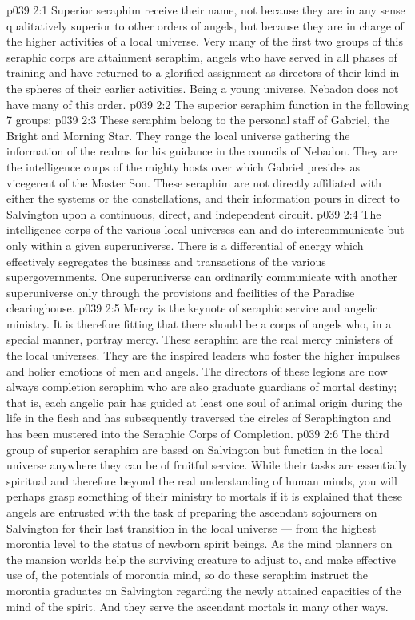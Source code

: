 \vs p039 2:1 Superior seraphim receive their name, not because they are in any sense qualitatively superior to other orders of angels, but because they are in charge of the higher activities of a local universe. Very many of the first two groups of this seraphic corps are attainment seraphim, angels who have served in all phases of training and have returned to a glorified assignment as directors of their kind in the spheres of their earlier activities. Being a young universe, Nebadon does not have many of this order.
\vs p039 2:2 The superior seraphim function in the following 7 groups:
\vs p039 2:3 \bibnobreakspace {} These seraphim belong to the personal staff of Gabriel, the Bright and Morning Star. They range the local universe gathering the information of the realms for his guidance in the councils of Nebadon. They are the intelligence corps of the mighty hosts over which Gabriel presides as vicegerent of the Master Son. These seraphim are not directly affiliated with either the systems or the constellations, and their information pours in direct to Salvington upon a continuous, direct, and independent circuit.
\vs p039 2:4 The intelligence corps of the various local universes can and do intercommunicate but only within a given superuniverse. There is a differential of energy which effectively segregates the business and transactions of the various supergovernments. One superuniverse can ordinarily communicate with another superuniverse only through the provisions and facilities of the Paradise clearinghouse.
\vs p039 2:5 \bibnobreakspace {} Mercy is the keynote of seraphic service and angelic ministry. It is therefore fitting that there should be a corps of angels who, in a special manner, portray mercy. These seraphim are the real mercy ministers of the local universes. They are the inspired leaders who foster the higher impulses and holier emotions of men and angels. The directors of these legions are now always completion seraphim who are also graduate guardians of mortal destiny; that is, each angelic pair has guided at least one soul of animal origin during the life in the flesh and has subsequently traversed the circles of Seraphington and has been mustered into the Seraphic Corps of Completion.
\vs p039 2:6 \bibnobreakspace {} The third group of superior seraphim are based on Salvington but function in the local universe anywhere they can be of fruitful service. While their tasks are essentially spiritual and therefore beyond the real understanding of human minds, you will perhaps grasp something of their ministry to mortals if it is explained that these angels are entrusted with the task of preparing the ascendant sojourners on Salvington for their last transition in the local universe --- from the highest morontia level to the status of newborn spirit beings. As the mind planners on the mansion worlds help the surviving creature to adjust to, and make effective use of, the potentials of morontia mind, so do these seraphim instruct the morontia graduates on Salvington regarding the newly attained capacities of the mind of the spirit. And they serve the ascendant mortals in many other ways.
